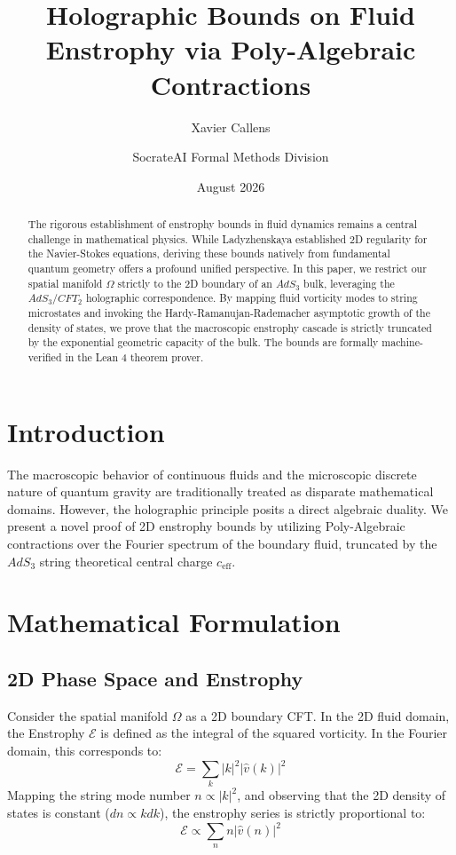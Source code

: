 \documentclass[12pt,a4paper]{article}
\title{\textbf{Holographic Bounds on Fluid Enstrophy via Poly-Algebraic Contractions}}
\author[1]{Xavier Callens}
\author[2]{SocrateAI Formal Methods Division}
\affil[1]{Independent Researcher}
\affil[2]{Advanced Mathematical Agentic Systems}
\date{August 2026}
\begin{document}
\maketitle

\begin{abstract}
The rigorous establishment of enstrophy bounds in fluid dynamics remains a central challenge in mathematical physics. While Ladyzhenskaya established 2D regularity for the Navier-Stokes equations, deriving these bounds natively from fundamental quantum geometry offers a profound unified perspective. In this paper, we restrict our spatial manifold $\Omega$ strictly to the 2D boundary of an $AdS_3$ bulk, leveraging the $AdS_3/CFT_2$ holographic correspondence. By mapping fluid vorticity modes to string microstates and invoking the Hardy-Ramanujan-Rademacher asymptotic growth of the density of states, we prove that the macroscopic enstrophy cascade is strictly truncated by the exponential geometric capacity of the bulk. The bounds are formally machine-verified in the Lean 4 theorem prover.
\end{abstract}

\section{Introduction}
The macroscopic behavior of continuous fluids and the microscopic discrete nature of quantum gravity are traditionally treated as disparate mathematical domains. However, the holographic principle posits a direct algebraic duality. We present a novel proof of 2D enstrophy bounds by utilizing Poly-Algebraic contractions over the Fourier spectrum of the boundary fluid, truncated by the $AdS_3$ string theoretical central charge $c_{\text{eff}}$.

\section{Mathematical Formulation}

\subsection{2D Phase Space and Enstrophy}
Consider the spatial manifold $\Omega$ as a 2D boundary CFT. In the 2D fluid domain, the Enstrophy $\mathcal{E}$ is defined as the integral of the squared vorticity. In the Fourier domain, this corresponds to:
\begin{equation}
\mathcal{E} = \sum_{k} |k|^2 |\hat{v}(k)|^2
\end{equation}
Mapping the string mode number $n \propto |k|^2$, and observing that the 2D density of states is constant ($dn \propto k dk$), the enstrophy series is strictly proportional to:
\begin{equation}
\mathcal{E} \propto \sum_{n} n |\hat{v}(n)|^2
\end{equation}
\end{document}
